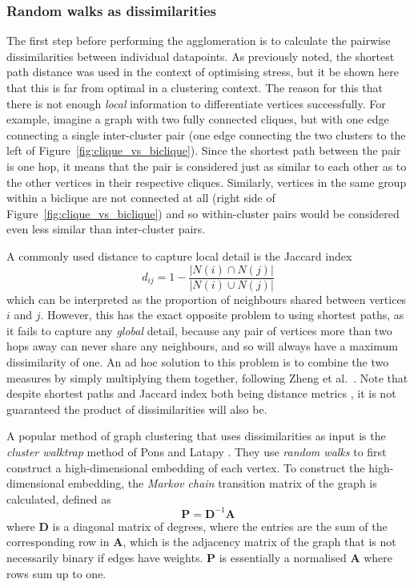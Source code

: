 \subsubsection{Random walks as dissimilarities}
The first step before performing the agglomeration is to calculate the pairwise dissimilarities between individual datapoints. As previously noted, the shortest path distance was used in the context of optimising stress, but it be shown here that this is far from optimal in a clustering context.
The reason for this that there is not enough \emph{local} information to differentiate vertices successfully.    
For example, imagine a graph with two fully connected cliques, but with one edge connecting a single inter-cluster pair (one edge connecting the two clusters to the left of Figure~\ref{fig:clique_vs_biclique}). Since the shortest path between the pair is one hop, it means that the pair is considered just as similar to each other as to the other vertices in their respective cliques.
Similarly, vertices in the same group within a biclique are not connected at all (right side of Figure~\ref{fig:clique_vs_biclique}) and so within-cluster pairs would be considered even less similar than inter-cluster pairs.

A commonly used distance to capture local detail is the Jaccard index
\begin{equation}
    d_{ij} = 1 - \frac{|N(i) \cap N(j)|}{|N(i) \cup N(j)|}
    \label{eq:jaccard}
\end{equation}
which can be interpreted as the proportion of neighbours shared between vertices $i$ and $j$. However, this has the exact opposite problem to using shortest paths, as it fails to capture any \emph{global} detail, because any pair of vertices more than two hops away can never share any neighbours, and so will always have a maximum dissimilarity of one.
An ad hoc solution to this problem is to combine the two measures by simply multiplying them together, following Zheng et al.\ \cite{Zheng2018}. Note that despite shortest paths and Jaccard index both being distance metrics \cite{Clarkson2006}, it is not guaranteed the product of dissimilarities will also be.

A popular method of graph clustering that uses dissimilarities as input is the \emph{cluster walktrap} method of Pons and Latapy \cite{Pons2006}. They use \emph{random walks} to first construct a high-dimensional embedding of each vertex.
To construct the high-dimensional embedding, the \emph{Markov chain} transition matrix of the graph is calculated, defined as
\begin{equation}
    \mathbf{P} = \mathbf{D}^{-1} \mathbf{A}
\end{equation}
where $\mathbf{D}$ is a diagonal matrix of degrees, where the entries are the sum of the corresponding row in $\mathbf{A}$, which is the adjacency matrix of the graph that is not necessarily binary if edges have weights. $\mathbf{P}$ is essentially a normalised $\mathbf{A}$ where rows sum up to one.

